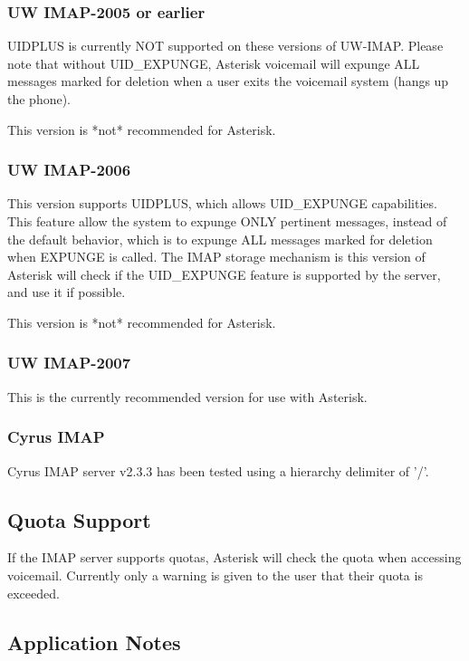 \subsubsection{UW IMAP-2005 or earlier}

UIDPLUS is currently NOT supported on these versions of UW-IMAP.  Please note
that without UID\_EXPUNGE, Asterisk voicemail will expunge ALL messages marked
for deletion when a user exits the voicemail system (hangs up the phone).

This version is *not* recommended for Asterisk.

\subsubsection{UW IMAP-2006}

This version supports UIDPLUS, which allows UID\_EXPUNGE capabilities.  This
feature allow the system to expunge ONLY pertinent messages, instead of the
default behavior, which is to expunge ALL messages marked for deletion when
EXPUNGE is called.  The IMAP storage mechanism is this version of Asterisk
will check if the UID\_EXPUNGE feature is supported by the server, and use it
if possible.

This version is *not* recommended for Asterisk.

\subsubsection{UW IMAP-2007}

This is the currently recommended version for use with Asterisk.

\subsubsection{Cyrus IMAP}

Cyrus IMAP server v2.3.3 has been tested using a hierarchy delimiter of '/'.


\subsection{Quota Support}

If the IMAP server supports quotas, Asterisk will check the quota when
accessing voicemail.  Currently only a warning is given to the user that
their quota is exceeded.


\subsection{Application Notes}

